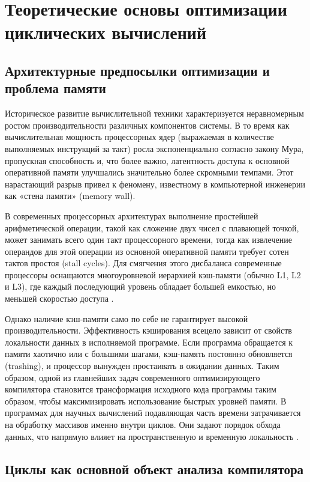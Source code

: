 \documentclass[14pt, russian]{scrartcl}
\begin{document}
\section{Теоретические основы оптимизации циклических вычислений}

\subsection{Архитектурные предпосылки оптимизации и проблема памяти}

Историческое развитие вычислительной техники характеризуется неравномерным ростом производительности различных компонентов системы. В то время как вычислительная мощность процессорных ядер (выражаемая в количестве выполняемых инструкций за такт) росла экспоненциально согласно закону Мура, пропускная способность и, что более важно, латентность доступа к основной оперативной памяти улучшались значительно более скромными темпами. Этот нарастающий разрыв привел к феномену, известному в компьютерной инженерии как «стена памяти» (memory wall). 

В современных процессорных архитектурах выполнение простейшей арифметической операции, такой как сложение двух чисел с плавающей точкой, может занимать всего один такт процессорного времени, тогда как извлечение операндов для этой операции из основной оперативной памяти требует сотен тактов простоя (stall cycles). Для смягчения этого дисбаланса современные процессоры оснащаются многоуровневой иерархией кэш-памяти (обычно L1, L2 и L3), где каждый последующий уровень обладает большей емкостью, но меньшей скоростью доступа \cite{allenKennedy2002}.

Однако наличие кэш-памяти само по себе не гарантирует высокой производительности. Эффективность кэширования всецело зависит от свойств локальности данных в исполняемой программе. Если программа обращается к памяти хаотично или с большими шагами, кэш-память постоянно обновляется (trashing), и процессор вынужден простаивать в ожидании данных. Таким образом, одной из главнейших задач современного оптимизирующего компилятора становится трансформация исходного кода программы таким образом, чтобы максимизировать использование быстрых уровней памяти. В программах для научных вычислений подавляющая часть времени затрачивается на обработку массивов именно внутри циклов. Они задают порядок обхода данных, что напрямую влияет на пространственную и временную локальность \cite{cooperTorczon2011}.

\subsection{Циклы как основной объект анализа компилятора}
\end{document}
